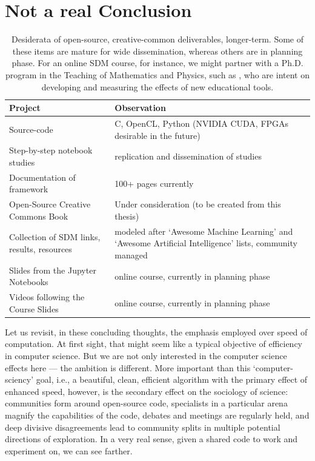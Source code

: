 \section{Not a real Conclusion}




\begin{table}[ht]
\begin{tabular}{|p{4cm}|p{7cm}|}  %
\hline
Project & Observation\tabularnewline
\hline
\hline
Source-code  & C, OpenCL, Python (NVIDIA CUDA, FPGAs desirable in the future)\tabularnewline
\hline
Step-by-step notebook studies & replication and dissemination of studies\tabularnewline
\hline
Documentation of framework & 100+ pages currently\tabularnewline
\hline
Open-Source Creative Commons Book & Under consideration (to be created from this thesis)\tabularnewline
\hline
Collection of SDM links, results, resources & modeled after `Awesome Machine Learning'\citep{misiti_awesome-machine-learning:_2018} and `Awesome Artificial Intelligence'\citep{lewis_awesome-artificial-intelligence:_2018} lists, community
managed\tabularnewline
\hline
Slides from the Jupyter Notebooks & online course, currently in planning phase\tabularnewline
\hline
Videos following the Course Slides  & online course, currently in planning phase\tabularnewline
\hline
\end{tabular}

\caption{Desiderata of open-source, creative-common deliverables, longer-term.  Some of these items are mature for wide dissemination, whereas others are in planning phase.  For an online SDM course, for instance, we might partner with a Ph.D. program in the Teaching of Mathematics and Physics, such as \citet{im/ufrj_programa_nodate}, who are intent on developing and measuring the effects of new educational tools.}

\end{table}






Let us revisit, in these concluding thoughts, the emphasis employed over speed of computation.  At first sight, that might seem like a typical objective of efficiency in computer science. But we are not only interested in the computer science effects here --- the ambition is different. More important than this `computer-sciency' goal, i.e., a beautiful, clean, efficient algorithm with the primary effect of enhanced speed, however, is the secondary effect on the sociology of science:  communities form around open-source code, specialists in a particular arena magnify the capabilities of the code, debates and meetings are regularly held, and deep divisive disagreements lead to community splits in multiple potential directions of exploration.  In a very real sense, given a shared code to work and experiment on, we can see farther.

